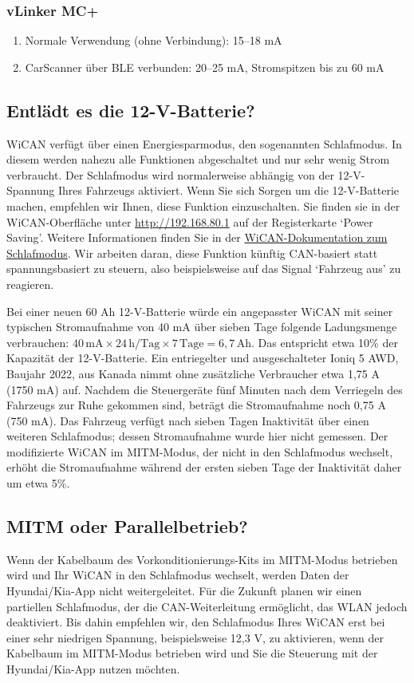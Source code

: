 \documentclass[superscriptaddress,onecolumn,floatfix]{revtex4-2}
\begin{document}
\subsubsection{vLinker MC+}
\begin{enumerate}
  \item Normale Verwendung (ohne Verbindung): 15--18 mA
  \item CarScanner über BLE verbunden: 20--25 mA, Stromspitzen bis zu 60 mA
\end{enumerate}

\subsection{Entlädt es die 12-V-Batterie?}

WiCAN verfügt über einen Energiesparmodus, den sogenannten Schlafmodus. In diesem werden nahezu alle Funktionen abgeschaltet und nur sehr wenig Strom verbraucht. Der Schlafmodus wird normalerweise abhängig von der 12-V-Spannung Ihres Fahrzeugs aktiviert. Wenn Sie sich Sorgen um die 12-V-Batterie machen, empfehlen wir Ihnen, diese Funktion einzuschalten. Sie finden sie in der WiCAN-Oberfläche unter \href{http://192.168.80.1}{http://192.168.80.1} auf der Registerkarte `Power Saving'. Weitere Informationen finden Sie in der \href{https://meatpihq.github.io/wican-fw/config/sleep-mode}{WiCAN-Dokumentation zum Schlafmodus}. Wir arbeiten daran, diese Funktion künftig CAN-basiert statt spannungsbasiert zu steuern, also beispielsweise auf das Signal `Fahrzeug aus' zu reagieren.

Bei einer neuen 60 Ah 12-V-Batterie würde ein angepasster WiCAN mit seiner typischen Stromaufnahme von 40 mA über sieben Tage folgende Ladungsmenge verbrauchen: $40\,\mathrm{mA} \times 24\,\mathrm{h/Tag} \times 7\,\mathrm{Tage} = 6{,}7\,\mathrm{Ah}$. Das entspricht etwa 10\% der Kapazität der 12-V-Batterie. Ein entriegelter und ausgeschalteter Ioniq 5 AWD, Baujahr 2022, aus Kanada nimmt ohne zusätzliche Verbraucher etwa 1,75 A (1750 mA) auf. Nachdem die Steuergeräte fünf Minuten nach dem Verriegeln des Fahrzeugs zur Ruhe gekommen sind, beträgt die Stromaufnahme noch 0,75 A (750 mA). Das Fahrzeug verfügt nach sieben Tagen Inaktivität über einen weiteren Schlafmodus; dessen Stromaufnahme wurde hier nicht gemessen. Der modifizierte WiCAN im MITM-Modus, der nicht in den Schlafmodus wechselt, erhöht die Stromaufnahme während der ersten sieben Tage der Inaktivität daher um etwa 5\%.

\subsection{MITM oder Parallelbetrieb?}
Wenn der Kabelbaum des Vorkonditionierungs-Kits im MITM-Modus betrieben wird und Ihr WiCAN in den Schlafmodus wechselt, werden Daten der Hyundai/Kia-App nicht weitergeleitet. Für die Zukunft planen wir einen partiellen Schlafmodus, der die CAN-Weiterleitung ermöglicht, das WLAN jedoch deaktiviert. Bis dahin empfehlen wir, den Schlafmodus Ihres WiCAN erst bei einer sehr niedrigen Spannung, beispielsweise 12,3 V, zu aktivieren, wenn der Kabelbaum im MITM-Modus betrieben wird und Sie die Steuerung mit der Hyundai/Kia-App nutzen möchten.
\end{document}
